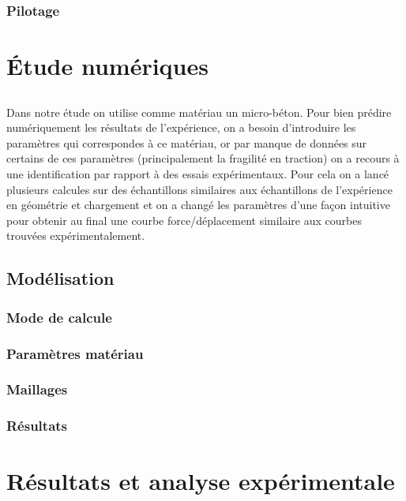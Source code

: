\documentclass{DGC_M2_report}
\begin{document}
\section{Pilotage}

\part{Étude numériques}
\chapter*{}
Dans notre étude on utilise comme matériau un micro-béton. Pour bien prédire numériquement
les résultats de l'expérience, on a besoin d'introduire les paramètres qui correspondes à ce
matériau, or par manque de données sur certains de ces paramètres (principalement la fragilité en
traction) on a recours à une identification par rapport à des essais expérimentaux. Pour cela on a
lancé plusieurs calcules sur des échantillons similaires aux échantillons de l'expérience en
géométrie et chargement et on a changé les paramètres d'une façon intuitive pour obtenir au final
une courbe force/déplacement similaire aux courbes trouvées expérimentalement.

\chapter{Modélisation}
\section{Mode de calcule}


\section{Paramètres matériau}


\section{Maillages}


\section{Résultats}


\part{Résultats et analyse expérimentale}
\chapter*{}
\end{document}
